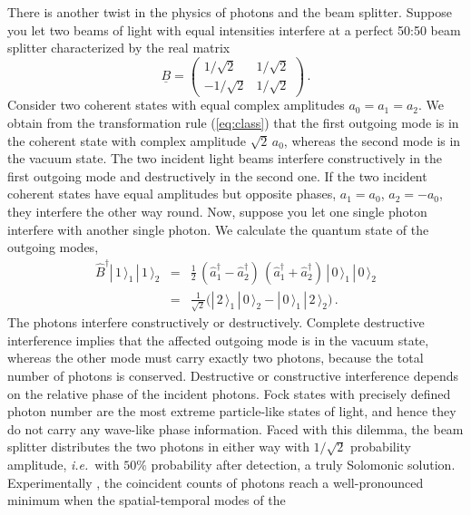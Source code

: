 \documentclass[12pt,amsmath,amssymb]{article}
\numberwithin{equation}{section}
\begin{document}
There is another twist in the physics of photons and the beam
splitter. Suppose you let two beams of light with equal
intensities interfere at a perfect 50:50 beam splitter
characterized by the real matrix
\begin{equation}
\label{eq:5050} \underline{B} = \left(
    \begin{array}{cc}
     {1}/{\sqrt{2}} & {1}/{\sqrt{2}} \\
     -{1}/{\sqrt{2}}& {1}/{\sqrt{2}}
    \end{array}
\right) \,.
\end{equation}
Consider two coherent states with equal complex amplitudes
$a_0=a_1=a_2$. We obtain from the transformation rule
(\ref{eq:class}) that the first outgoing mode is in the coherent
state with complex amplitude $\sqrt{2}\, a_0$, whereas the second
mode is in the vacuum state. The two incident light beams
interfere constructively in the first outgoing mode and
destructively in the second one. If the two incident coherent
states have equal amplitudes but opposite phases, $a_1=a_0$,
$a_2=-a_0$, they interfere the other way round. Now, suppose you
let one single photon interfere with another single photon. We
calculate the quantum state of the outgoing modes,
\begin{eqnarray}
\hat{B}^\dagger |\,1\,\rangle_1\, |\,1\,\rangle_2 &=&
\frac{1}{2}\, \left(\hat{a}_1^\dagger-\hat{a}_2^\dagger\right)\,
\left(\hat{a}_1^\dagger+\hat{a}_2^\dagger\right)\,
|\,0\,\rangle_1\,|\,0\,\rangle_2
\nonumber\\
&=& \frac{1}{\sqrt{2}} \Big( |\,2\,\rangle_1\,|\,0\,\rangle_2 -
|\,0\,\rangle_1\,|\,2\,\rangle_2 \Big)\,. \label{eq:interfere}
\end{eqnarray}
The photons interfere constructively or destructively.
Complete destructive interference implies that the affected
outgoing mode is in the vacuum state, whereas the other mode must
carry exactly two photons, because the total number of photons is
conserved. Destructive or constructive interference depends on
the relative phase of the incident photons. Fock states with
precisely defined photon number are the most extreme particle-like
states of light, and hence they do not carry any wave-like phase
information. Faced with this dilemma, the beam splitter
distributes the two photons in either way with
$1/\sqrt{2}$ probability amplitude, {\it i.e.}\ with
$50\%$ probability after detection,
a truly Solomonic solution. Experimentally
\cite{Hong}, the coincident counts of photons reach a
well-pronounced minimum when the spatial-temporal modes of the
\end{document}
